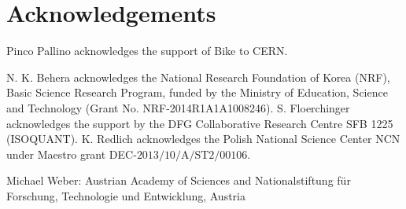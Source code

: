 \section*{Acknowledgements}


Pinco Pallino acknowledges the support of Bike to CERN.

N. K. Behera acknowledges the National Research Foundation of Korea (NRF), Basic Science Research Program, funded by the Ministry of Education, Science and Technology (Grant No. NRF-2014R1A1A1008246).
S. Floerchinger acknowledges the support by the DFG Collaborative Research Centre SFB 1225 (ISOQUANT). 
K. Redlich acknowledges the Polish National Science Center NCN under Maestro grant DEC-$\mathrm{2013/10/A/ST2/00106}$. 

Michael Weber:  Austrian Academy of Sciences and Nationalstiftung f\"ur Forschung, Technologie und Entwicklung, Austria

